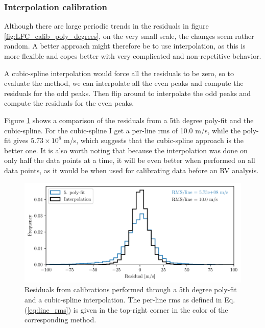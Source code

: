     \subsubsection{Interpolation calibration}
    Although there are large periodic trends in the residuals in figure \ref{fig:LFC_calib_poly_degrees}, on the very small scale, the changes seem rather random. A better approach might therefore be to use interpolation, as this is more flexible and copes better with very complicated and non-repetitive behavior.
    
    A cubic-spline interpolation would force all the residuals to be zero, so to evaluate the method, we can interpolate all the even peaks and compute the residuals for the odd peaks. Then flip around to interpolate the odd peaks and compute the residuals for the even peaks.

    Figure \ref{fig:calib_poly_vs_interp} shows a comparison of the residuals from a 5th degree poly-fit and the cubic-spline. For the cubic-spline I get a per-line rms of 10.0 m/s, while the poly-fit gives $5.73 \times 10^8$ m/s, which suggests that the cubic-spline approach is the better one. It is also worth noting that because the interpolation was done on only half the data points at a time, it will be even better when performed on all data points, as it would be when used for calibrating data before an RV analysis.

    \begin{figure}%
        \begin{wide}  
            \includegraphics[width=\textwidth]{figures/calib/hist_peak_residuals_poly_and_interp.pdf}
            \caption{Residuals from calibrations performed through a 5th degree poly-fit and a cubic-spline interpolation. The per-line rms as defined in Eq. (\ref{eq:line_rms}) is given in the top-right corner in the color of the corresponding method.}
            \label{fig:calib_poly_vs_interp}
        \end{wide}
    \end{figure}

